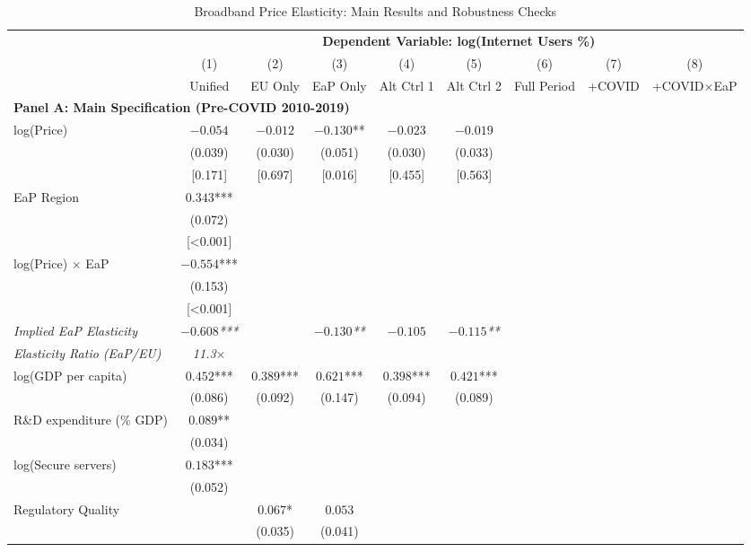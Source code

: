 \begin{table}[htbp]
\centering
\small
\caption{Broadband Price Elasticity: Main Results and Robustness Checks}
\label{tab:comprehensive}
\begin{tabular}{@{}lcccccccc@{}}
\toprule
& \multicolumn{8}{c}{\textbf{Dependent Variable: log(Internet Users \%)}} \\
\cmidrule(lr){2-9}
& (1) & (2) & (3) & (4) & (5) & (6) & (7) & (8) \\
& Unified & EU Only & EaP Only & Alt Ctrl 1 & Alt Ctrl 2 & Full Period & +COVID & +COVID$\times$EaP \\
\midrule
\multicolumn{9}{l}{\textbf{Panel A: Main Specification (Pre-COVID 2010-2019)}} \\
\midrule
log(Price) & $-0.054$ & $-0.012$ & $-0.130$** & $-0.023$ & $-0.019$ & & & \\
& (0.039) & (0.030) & (0.051) & (0.030) & (0.033) & & & \\
& [0.171] & [0.697] & [0.016] & [0.455] & [0.563] & & & \\
\addlinespace
EaP Region & $0.343$*** & & & & & & & \\
& (0.072) & & & & & & & \\
& [<0.001] & & & & & & & \\
\addlinespace
log(Price) $\times$ EaP & $-0.554$*** & & & & & & & \\
& (0.153) & & & & & & & \\
& [<0.001] & & & & & & & \\
\addlinespace
\textit{Implied EaP Elasticity} & \textit{$-0.608$***} & & \textit{$-0.130$**} & \textit{$-0.105$} & \textit{$-0.115$**} & & & \\
\textit{Elasticity Ratio (EaP/EU)} & \textit{11.3$\times$} & & & & & & & \\
\addlinespace
log(GDP per capita) & $0.452$*** & $0.389$*** & $0.621$*** & $0.398$*** & $0.421$*** & & & \\
& (0.086) & (0.092) & (0.147) & (0.094) & (0.089) & & & \\
\addlinespace
R\&D expenditure (\% GDP) & $0.089$** & & & & & & & \\
& (0.034) & & & & & & & \\
\addlinespace
log(Secure servers) & $0.183$*** & & & & & & & \\
& (0.052) & & & & & & & \\
\addlinespace
Regulatory Quality & & $0.067$* & $0.053$ & & & & & \\
& & (0.035) & (0.041) & & & & & \\

\end{tabular}
\end{table}
